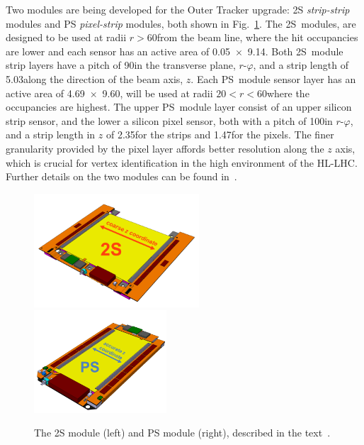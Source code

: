 Two \pT modules are being developed for the Outer Tracker upgrade: 2S \emph{strip-strip} modules and PS \emph{pixel-strip} modules, both shown in Fig.~\ref{fig:2Spsmodules}.
The 2S~modules, are designed to be used at radii $r>60$\cm from the beam line, where the hit occupancies are lower and each sensor has an active area of 0.05\cm~$\times$~9.14\cm.
Both 2S~module strip layers have a pitch of 90\mum in the transverse plane, $r$-$\varphi$, and a strip length of 5.03\cm along the direction of the beam axis, $z$.
Each PS~module sensor layer has an active area of 4.69\cm~$\times$~9.60\cm, will be used at radii $20<r<60$\cm where the occupancies are highest.
The upper PS~module layer consist of an upper silicon strip sensor, and the lower a silicon pixel sensor, both with a pitch of 100\mum in $r$-$\varphi$, and a strip length in $z$ of 2.35\cm for the strips and 1.47\mm for the pixels.
The finer granularity provided by the pixel layer affords better resolution along the $z$ axis, which is crucial for vertex identification in the high \PU environment of the HL-LHC.
Further details on the two \pT modules can be found in~\cite{CMS_Upgrade_TP,P2TrackerTDR}.
 
\begin{figure}[tp]
\centering
\includegraphics[width=0.55\textwidth,trim={0truecm 0truecm 0truecm 1truecm},clip]{figs/tk-upgrade/2S_assembled.png}
\hfill
\includegraphics[width=0.44\textwidth,trim={0truecm 0truecm 0truecm 1truecm},clip]{figs/tk-upgrade/PS_assembled.png}
\caption{The 2S module (left) and PS module (right), described in the text~\cite{P2TrackerTDR}.}
\label{fig:2Spsmodules}
\end{figure}

